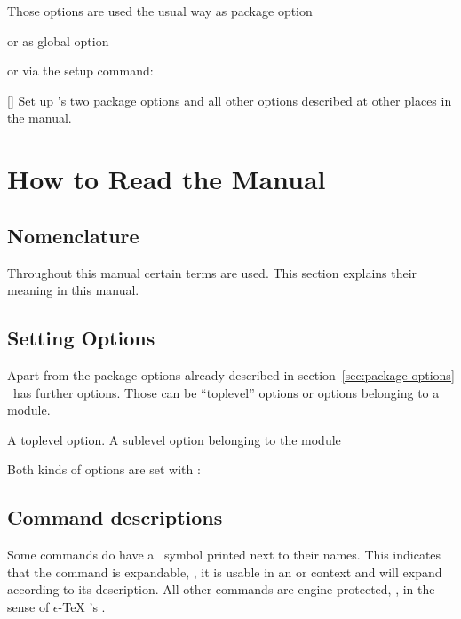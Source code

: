 \documentclass[load-preamble+]{cnltx-doc}
\newcommand*\eTeX{%
  \texorpdfstring
    {\mbox{$\epsilon$-\TeX}}
    {e-TeX}%
}
\begin{document}
Those options are used the usual way as package option
\begin{sourcecode}
  \usepackage[verbose]{xsim}
\end{sourcecode}
or as global option
or via the setup command:
\begin{commands}
  []
    Set up \xsim's two package options and all other options described at
    other places in the manual.
\end{commands}

\section{How to Read the Manual}\label{sec:how-read-manual}

\subsection{Nomenclature}

Throughout this manual certain terms are used.  This section explains their
meaning in this manual.

\acuseall
\printacronyms[heading=none]

\subsection{Setting Options}
Apart from the package options already described in
section~\ref{sec:package-options} \xsim\ has further options. Those can be
\enquote{toplevel} options or options belonging to a module.
\begin{options}
    A toplevel option.
    A sublevel option belonging to the module 
\end{options}
Both kinds of options are set with :
\begin{sourcecode}
\end{sourcecode}

\subsection{Command descriptions}

Some commands do have a \expandablesymbol\ symbol printed next to their
names.  This indicates that the command is expandable, \ie, it is usable in an
 or  context and will expand according to its
description.  All other commands are engine protected, \ie, in the sense of
\eTeX's .
\end{document}
